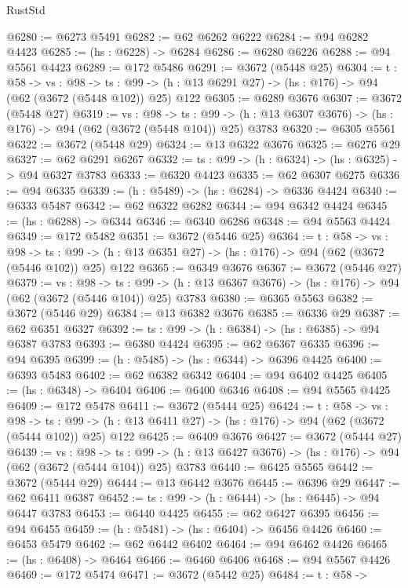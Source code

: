 \begin{lexlean}{RustStd}
\begin{coremodule}
{\begin{coremodule}
{{{{{{{{{@6280 := @6273 @5491
@6282 := @62 @6262 @6222
@6284 := @94 @6282 @4423
@6285 := (hs : @6228) -> @6284
@6286 := @6280 @6226
@6288 := @94 @5561 @4423
@6289 := @172 @5486
@6291 := @3672 (@5448 @25)
@6304 := {t : @58} ->
  {vs : @98} ->
  {ts : @99} -> (h : @13 @6291 @27) -> (hs : @176) -> @94 (@62 (@3672 (@5448 @102)) @25) @122
@6305 := @6289 @3676
@6307 := @3672 (@5448 @27)
@6319 := {vs : @98} ->
  {ts : @99} -> (h : @13 @6307 @3676) -> (hs : @176) -> @94 (@62 (@3672 (@5448 @104)) @25) @3783
@6320 := @6305 @5561
@6322 := @3672 (@5448 @29)
@6324 := @13 @6322 @3676
@6325 := @6276 @29
@6327 := @62 @6291 @6267
@6332 := {ts : @99} -> (h : @6324) -> (hs : @6325) -> @94 @6327 @3783
@6333 := @6320 @4423
@6335 := @62 @6307 @6275
@6336 := @94 @6335
@6339 := (h : @5489) -> (hs : @6284) -> @6336 @4424
@6340 := @6333 @5487
@6342 := @62 @6322 @6282
@6344 := @94 @6342 @4424
@6345 := (hs : @6288) -> @6344
@6346 := @6340 @6286
@6348 := @94 @5563 @4424
@6349 := @172 @5482
@6351 := @3672 (@5446 @25)
@6364 := {t : @58} ->
  {vs : @98} ->
  {ts : @99} -> (h : @13 @6351 @27) -> (hs : @176) -> @94 (@62 (@3672 (@5446 @102)) @25) @122
@6365 := @6349 @3676
@6367 := @3672 (@5446 @27)
@6379 := {vs : @98} ->
  {ts : @99} -> (h : @13 @6367 @3676) -> (hs : @176) -> @94 (@62 (@3672 (@5446 @104)) @25) @3783
@6380 := @6365 @5563
@6382 := @3672 (@5446 @29)
@6384 := @13 @6382 @3676
@6385 := @6336 @29
@6387 := @62 @6351 @6327
@6392 := {ts : @99} -> (h : @6384) -> (hs : @6385) -> @94 @6387 @3783
@6393 := @6380 @4424
@6395 := @62 @6367 @6335
@6396 := @94 @6395
@6399 := (h : @5485) -> (hs : @6344) -> @6396 @4425
@6400 := @6393 @5483
@6402 := @62 @6382 @6342
@6404 := @94 @6402 @4425
@6405 := (hs : @6348) -> @6404
@6406 := @6400 @6346
@6408 := @94 @5565 @4425
@6409 := @172 @5478
@6411 := @3672 (@5444 @25)
@6424 := {t : @58} ->
  {vs : @98} ->
  {ts : @99} -> (h : @13 @6411 @27) -> (hs : @176) -> @94 (@62 (@3672 (@5444 @102)) @25) @122
@6425 := @6409 @3676
@6427 := @3672 (@5444 @27)
@6439 := {vs : @98} ->
  {ts : @99} -> (h : @13 @6427 @3676) -> (hs : @176) -> @94 (@62 (@3672 (@5444 @104)) @25) @3783
@6440 := @6425 @5565
@6442 := @3672 (@5444 @29)
@6444 := @13 @6442 @3676
@6445 := @6396 @29
@6447 := @62 @6411 @6387
@6452 := {ts : @99} -> (h : @6444) -> (hs : @6445) -> @94 @6447 @3783
@6453 := @6440 @4425
@6455 := @62 @6427 @6395
@6456 := @94 @6455
@6459 := (h : @5481) -> (hs : @6404) -> @6456 @4426
@6460 := @6453 @5479
@6462 := @62 @6442 @6402
@6464 := @94 @6462 @4426
@6465 := (hs : @6408) -> @6464
@6466 := @6460 @6406
@6468 := @94 @5567 @4426
@6469 := @172 @5474
@6471 := @3672 (@5442 @25)
@6484 := {t : @58} ->
}}}}}}}}}
\end{coremodule}}
\end{coremodule}
\end{lexlean}
